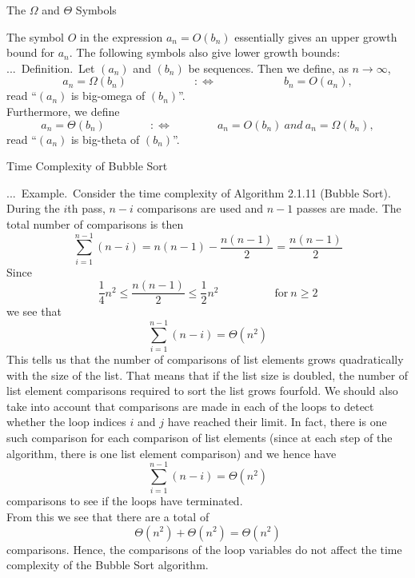 \documentclass[smaller,hyperref={CJKbookmarks=true}]{beamer}
\newcounter{zhuo}[subsection]
\renewcommand{\thezhuo}{\thesection.\thesubsection.\arabic{zhuo}}
\newenvironment{DEFINITION}{\stepcounter{zhuo}\alert{\thezhuo.~Definition.\,}}{}
\newenvironment{EXAMPLE}{\stepcounter{zhuo}\alert{\!\thezhuo.~Example.\,}}{}
\begin{document}
\begin{frame}[c]{The $\Omega$ and $\Theta$ Symbols}
\begin{spacing}{1.1}
The symbol $O$ in the expression $a_n=O(b_n)$ essentially gives an upper growth bound for $a_n$. The following symbols also give lower growth bounds:\\[5pt]
\begin{DEFINITION}
Let $(a_n)$ and $(b_n)$ be sequences. Then we define, as $n\to\infty$,
\begin{equation}\label{2.1.3}
a_n=\Omega(b_n)\qquad\qquad\qquad:\Leftrightarrow
\qquad\qquad\qquad b_n=O(a_n),
\end{equation}
read ``$(a_n)$ is big-omega of $(b_n)$''.\\[4pt]
Furthermore, we define
\begin{equation}\label{2.1.4}
a_n=\Theta(b_n)\qquad\qquad:\Leftrightarrow\qquad
\qquad a_n=O(b_n)~and~a_n=\Omega(b_n),
\end{equation}
read ``$(a_n)$ is big-theta of $(b_n)$''.
\end{DEFINITION}
\end{spacing}
\end{frame}
\begin{frame}{Time Complexity of Bubble Sort}
\begin{spacing}{1}
\vspace*{-6pt}
\begin{EXAMPLE}
Consider the time complexity of Algorithm 2.1.11 (Bubble Sort). During the $i$th pass, $n-i$ comparisons are used and $n-1$ passes are made. The total number of comparisons is then
\[\sum_{i=1}^{n-1}(n-i)=n(n-1)-\frac{n(n-1)}{2}=
\frac{n(n-1)}{2}\]
Since
\[\frac{1}{4}n^2\leq\frac{n(n-1)}{2}\leq\frac{1}{2}n^2
\qquad\qquad\quad\text{for}~n\geq2\]
we see that
\[\sum_{i=1}^{n-1}(n-i)=\Theta(n^2)\]
\end{EXAMPLE}
This tells us that the number of comparisons of list elements grows
quadratically with the size of the list. That means that if the list size is
doubled, the number of list element comparisons required to sort the list
grows fourfold.
\newpage
We should also take into account that comparisons are made in each of
the loops to detect whether the loop indices $i$ and $j$ have reached their
limit. In fact, there is one such comparison for each comparison of list
elements (since at each step of the algorithm, there is one list element
comparison) and we hence have
\[\sum_{i=1}^{n-1}(n-i)=\Theta(n^2)\]
comparisons to see if the loops have terminated.\\[5pt]
From this we see that there are a total of
\[\Theta(n^2)+\Theta(n^2)=\Theta(n^2)\]
comparisons. Hence, the comparisons of the loop variables do not affect
the time complexity of the Bubble Sort algorithm.
\end{spacing}
\end{frame}
\end{document}
